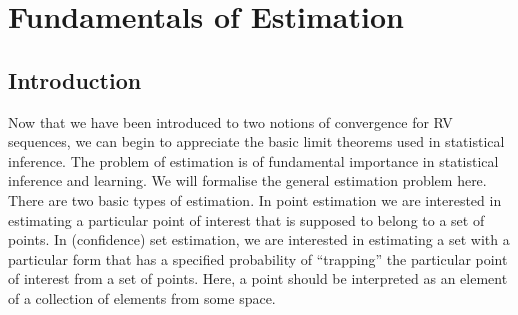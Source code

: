\section{Fundamentals of Estimation}

\subsection{Introduction}
Now that we have been introduced to two notions of convergence for RV sequences, we can begin to appreciate the basic limit theorems used in statistical inference.  The problem of estimation is of fundamental importance in statistical inference and learning.  We will formalise the general estimation problem here.  There are two basic types of estimation.  In point estimation we are interested in estimating a particular point of interest that is supposed to belong to a set of points.  In (confidence) set estimation, we are interested in estimating a set with a particular form that has a specified probability of ``trapping'' the particular point of interest from a set of points.  Here, a point should be interpreted as an element of a collection of elements from some space.

